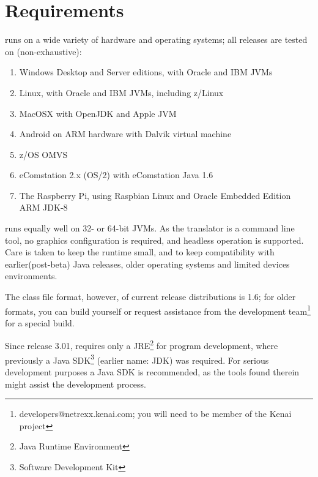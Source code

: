 \chapter{Requirements}
\nr{} \nrversion{} runs on a wide variety of
hardware and operating systems; all releases are tested on (non-exhaustive):
\begin{enumerate}
\item Windows Desktop and Server editions, with Oracle and IBM JVMs
\item Linux, with Oracle and IBM JVMs, including z/Linux
\item MacOSX with OpenJDK and Apple JVM
\item Android on ARM hardware with Dalvik virtual machine
\item z/OS OMVS
\item eComstation 2.x (OS/2) with eComstation Java 1.6
\item The Raspberry Pi, using Raspbian Linux and Oracle Embedded
  Edition ARM JDK-8
\end{enumerate}
\nr{} runs equally well on 32- or 64-bit JVMs. As the translator is
a command line tool, no graphics configuration is required, and
headless operation is supported. Care is taken to keep the \nr{} runtime small, and to keep
compatibility with earlier(post-beta) Java releases, older operating systems and
limited devices environments. 

The class file format, however, of
current release distributions is 1.6; for older formats, you
can build \nr{} yourself or request assistance from the development
team\footnote{developers@netrexx.kenai.com; you will
  need to be member of the Kenai \nr{} project} for a special build.
\begin{shaded}\noindent
Since release 3.01, \nr{} requires only a
JRE\footnote{Java Runtime Environment} for program development, where previously a
Java SDK\footnote{Software Development Kit} (earlier name: JDK) was required. For serious development
purposes a Java SDK is recommended, as the tools found therein might
assist the development process.
\end{shaded}\indent